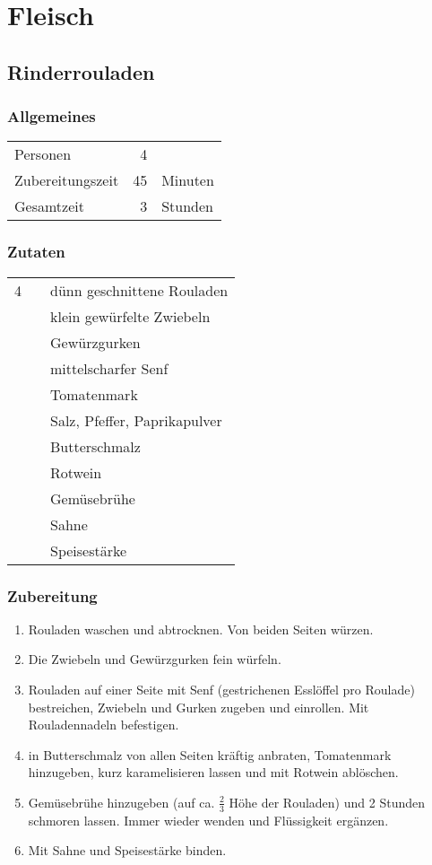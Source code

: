 \section{Fleisch}

\subsection{Rinderrouladen}
\subsubsection*{Allgemeines}
\begin{tabular}{lrl}
	Personen         &  4 &  \\
	Zubereitungszeit & 45 & Minuten \\
	Gesamtzeit       &  3 & Stunden \\
\end{tabular} 

\subsubsection*{Zutaten}
\begin{tabular}{rll}
	4 &  & dünn geschnittene Rouladen   \\
	  &  & klein gewürfelte Zwiebeln    \\
	  &  & Gewürzgurken                 \\
	  &  & mittelscharfer Senf          \\
	  &  & Tomatenmark                  \\
	  &  & Salz, Pfeffer, Paprikapulver \\
	  &  & Butterschmalz                \\
	  &  & Rotwein                      \\
	  &  & Gemüsebrühe					\\
	  &  & Sahne \\
	  & & Speisestärke
\end{tabular} 
\subsubsection*{Zubereitung}
\begin{enumerate}
	\item Rouladen waschen und abtrocknen. Von beiden Seiten würzen.
	\item Die Zwiebeln und Gewürzgurken fein würfeln. 
	\item Rouladen auf einer Seite mit Senf (gestrichenen Esslöffel pro Roulade) bestreichen, Zwiebeln und Gurken zugeben und einrollen. Mit Rouladennadeln befestigen.   
	\item in Butterschmalz von allen Seiten kräftig anbraten, Tomatenmark hinzugeben, kurz karamelisieren lassen und mit Rotwein ablöschen.
	\item  Gemüsebrühe hinzugeben (auf ca. $\frac{2}{3}$ Höhe der Rouladen)  und 2 Stunden schmoren lassen. Immer wieder wenden und Flüssigkeit ergänzen.
	\item  Mit Sahne und Speisestärke binden.
\end{enumerate}

